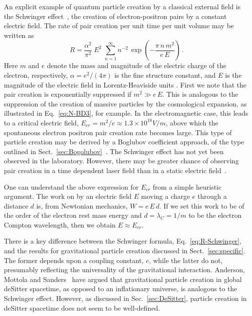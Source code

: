 \documentclass[12pt,onecolumn,eqsecnum,floats,aps,prd,floatfix,titlepage,tightenlines]{revtex4-2}
\begin{document}
An explicit example of quantum particle creation by a classical external field is the Schwinger effect~\cite{Schwinger},
the creation of electron-positron pairs by a constant electric field. The rate of pair creation per unit time per unit 
volume may be written as
\begin{equation}
R = \frac{\alpha^2}{\pi^2}\; E^2\; \sum_{n=1}^\infty n^{-2}\, \exp\left(-\frac{\pi\, n\, m^2}{e\, E} \right)\,.
\label{eq:R-Schwinger} 
 \end{equation}
Here $m$ and $e$ denote the mass and magnitude of the electric charge of the electron, respectively, $\alpha = e^2/(4 \pi)$ is the fine structure
constant, and $E$ is the magnitude of the electric field in Lorentz-Heaviside units . First we note that the pair creation is exponentially suppressed if $m^2 \gg e\, E$.
This is analogous to the suppression of the creation of massive particles by the cosmological expansion, as illustrated in Eq.~\eqref{eq:N-BD3},
for example.  In the electromagnetic case, this leads to a critical electric field, $E_{cr} = m^2/e \approx  1.3 \times 10^{18} V/m$, above which the spontaneous 
electron positron pair  creation rate becomes large. This type of particle creation may be derived by a Boglubov coefficient approach, of the type outlined in
Sect.~\ref{sec:Bogolubov}~\cite{Grib94}. The Schwinger effect has not yet been observed in the laboratory. However, there may be greater chance of
observing pair  creation in a time dependent laser field than in a static electric field~\cite{Dunne09}.

One can understand the above expression for $E_{cr}$ from a simple heuristic argument. The work on by an electric field $E$ moving a charge
$e$ through a distance $d$ is, from Newtonian mechanics, $W = e\, E\, d$. If we set this work to be of the order of the electron rest mass energy
and $d =\lambda_C = 1/m$ to be the electron Compton wavelength, then we obtain $E\approx E_{cr}$.

There is a key difference between the Schwinger formula, Eq.~\eqref{eq:R-Schwinger}, and the results for gravitational particle creation discussed
in Sect.~\ref{sec:specific}. The former depends upon a coupling constant, $e$, while the latter do not, presumably reflecting the universality of the
gravitational  interaction. Anderson, Mottola and Sanders~\cite{AM14,AMS18}   have argued that gravitational particle creation in global deSitter spacetime, 
as opposed to an inflationary universe, is analogous to the Schwinger effect. However, as discussed in Sec.~\ref{sec:DeSitter}, particle creation in  
deSitter spacetime does not seem to be well-defined.
 
\end{document}
